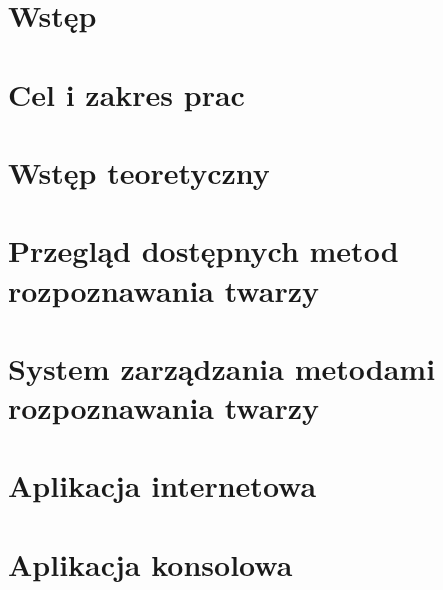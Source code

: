 \documentclass[11pt, a4paper,polish,twoside]{report}
\numberwithin{equation}{section}
\begin{document}



\newpage
\null
\thispagestyle{empty}
\newpage
%



\tableofcontents

\chapter{Wstęp}


\chapter{Cel i zakres prac}


\chapter{Wstęp teoretyczny}


\chapter{Przegląd dostępnych metod rozpoznawania twarzy}


\chapter{System zarządzania metodami rozpoznawania twarzy}


\chapter{Aplikacja internetowa}


\chapter{Aplikacja konsolowa}

\end{document}
